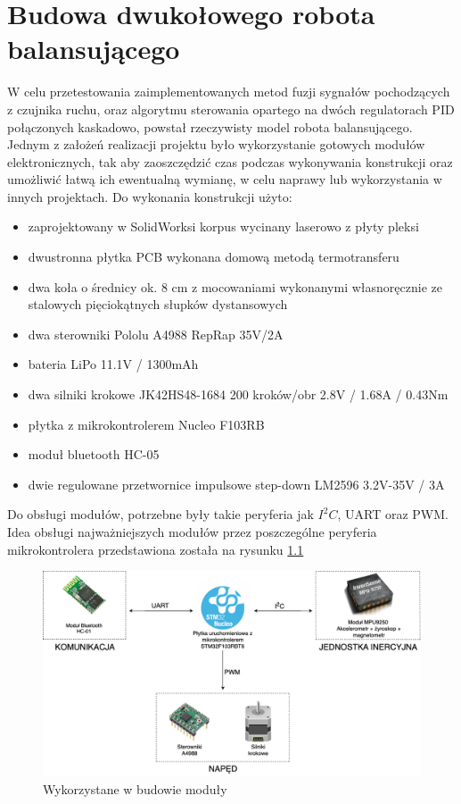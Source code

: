 \chapter{Budowa dwukołowego robota balansującego}
\label{chap:budowa}

W celu przetestowania zaimplementowanych metod fuzji sygnałów pochodzących z czujnika ruchu, oraz algorytmu sterowania opartego na dwóch regulatorach PID połączonych kaskadowo, powstał rzeczywisty model robota balansującego. Jednym z założeń realizacji projektu było wykorzystanie gotowych modułów elektronicznych, tak aby zaoszczędzić czas podczas wykonywania konstrukcji oraz umożliwić łatwą ich ewentualną wymianę, w celu naprawy lub wykorzystania w innych projektach. Do wykonania konstrukcji użyto:
\begin{itemize}
    \item zaprojektowany w SolidWorksi korpus wycinany laserowo z płyty pleksi
    \item dwustronna płytka PCB wykonana domową metodą termotransferu
    \item dwa koła o średnicy ok. 8 cm z mocowaniami wykonanymi własnoręcznie ze stalowych pięciokątnych słupków dystansowych
    \item dwa sterowniki Pololu A4988 RepRap 35V/2A
    \item bateria LiPo 11.1V / 1300mAh
    \item dwa silniki krokowe JK42HS48-1684 200 kroków/obr 2.8V / 1.68A / 0.43Nm
    \item płytka z mikrokontrolerem Nucleo F103RB
    \item moduł bluetooth HC-05
    \item dwie regulowane przetwornice impulsowe step-down LM2596 3.2V-35V / 3A
\end{itemize}

Do obsługi modułów, potrzebne były takie peryferia jak $I^2C$, UART oraz PWM. Idea obsługi najważniejszych modułów przez poszczególne peryferia mikrokontrolera przedstawiona została na rysunku \ref{Moduly}

\begin{figure}[h!]
    \centering
    \includegraphics[width=1\textwidth]{Rysunki/Rozdzial05/Platforma_sprzetowa.png}
    \caption{Wykorzystane w budowie moduły}
    \label{Moduly}
\end{figure}

